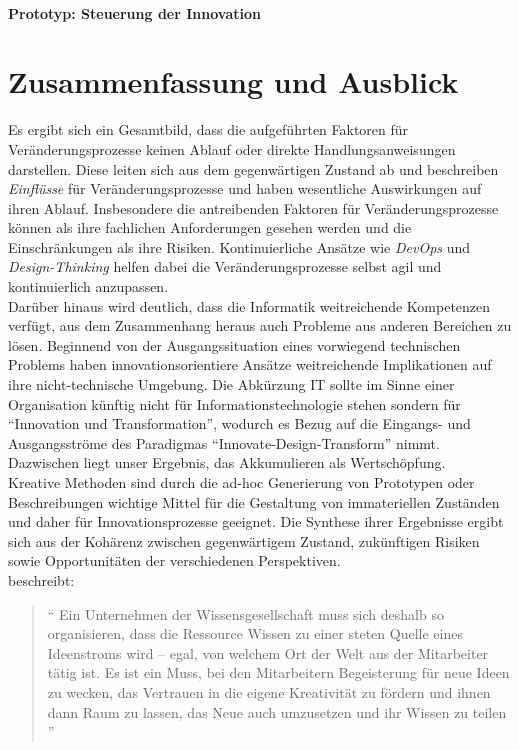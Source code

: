\paragraph{Prototyp: Steuerung der Innovation}


\section{Zusammenfassung und Ausblick}
Es ergibt sich ein Gesamtbild, dass die aufgeführten Faktoren für Veränderungsprozesse keinen Ablauf oder direkte Handlungsanweisungen darstellen. Diese leiten sich aus dem gegenwärtigen Zustand ab und beschreiben \emph{Einflüsse} für Veränderungsprozesse und haben wesentliche Auswirkungen auf ihren Ablauf. Insbesondere die antreibenden Faktoren für Veränderungsprozesse können als ihre fachlichen Anforderungen gesehen werden und die Einschränkungen als ihre Risiken. Kontinuierliche Ansätze wie \emph{DevOps} und \emph{Design-Thinking} helfen dabei die Veränderungsprozesse selbst agil und kontinuierlich anzupassen. 
\medskip
\\
Darüber hinaus wird deutlich, dass die Informatik weitreichende Kompetenzen verfügt, aus dem Zusammenhang heraus auch Probleme aus anderen Bereichen zu lösen. Beginnend von der Ausgangssituation eines vorwiegend technischen Problems haben innovationsorientiere Ansätze weitreichende Implikationen auf ihre nicht-technische Umgebung. Die Abkürzung IT sollte im Sinne einer Organisation künftig nicht für Informationstechnologie stehen sondern für \enquote{Innovation und Transformation}, wodurch es Bezug auf die Eingangs- und Ausgangsströme des Paradigmas \enquote{Innovate-Design-Transform} nimmt. Dazwischen liegt unser Ergebnis, das Akkumulieren als Wertschöpfung.
\medskip
\\
Kreative Methoden sind durch die ad-hoc Generierung von Prototypen oder Beschreibungen wichtige Mittel für die Gestaltung von immateriellen Zuständen und daher für Innovationsprozesse geeignet. Die Synthese ihrer Ergebnisse ergibt sich aus der Kohärenz zwischen gegenwärtigem Zustand, zukünftigen Risiken sowie Opportunitäten der verschiedenen Perspektiven. 
\medskip
\\
\citet{Ganswindt2006} beschreibt:
\begin{quote}
    \enquote{
    Ein Unternehmen der Wissensgesellschaft muss sich deshalb so organisieren, dass die Ressource Wissen zu einer steten Quelle eines Ideenstroms wird – egal, von welchem Ort der Welt aus der Mitarbeiter tätig ist. Es ist ein Muss, bei den Mitarbeitern Begeisterung für neue Ideen zu wecken, das Vertrauen in die eigene Kreativität zu fördern und ihnen dann Raum zu lassen, das Neue auch umzusetzen und ihr Wissen zu teilen
    }
\end{quote}
